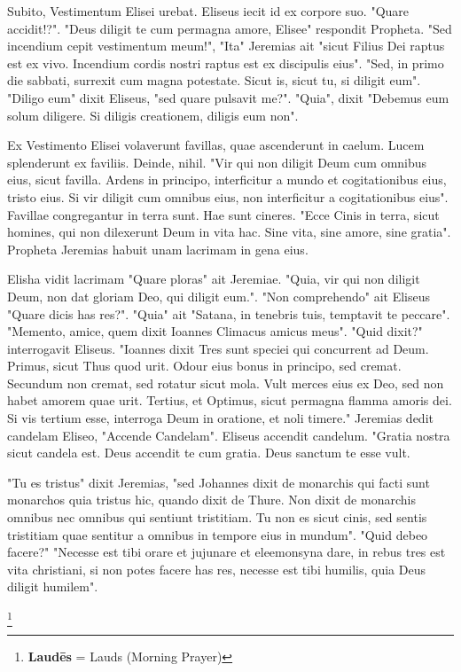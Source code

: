 Subito, Vestimentum Elisei urebat. Eliseus iecit id ex corpore suo. "Quare accidit!?". "Deus diligit te cum permagna amore, Elisee" respondit Propheta. "Sed incendium cepit vestimentum meum!", "Ita" Jeremias ait "sicut Filius Dei raptus est ex vivo. Incendium cordis nostri raptus est ex discipulis eius". "Sed, in primo die sabbati, surrexit cum magna potestate. Sicut is, sicut tu, si diligit eum". "Diligo eum" dixit Eliseus, "sed quare pulsavit me?". "Quia", dixit "Debemus eum solum diligere. Si diligis creationem, diligis eum non". \par 
Ex Vestimento Elisei volaverunt favillas, quae ascenderunt in caelum. Lucem splenderunt ex faviliis. Deinde, nihil. "Vir qui non diligit Deum cum omnibus eius, sicut favilla. Ardens in principo, interficitur a mundo et cogitationibus eius, tristo eius. Si vir diligit cum omnibus eius, non interficitur a cogitationibus eius". Favillae congregantur in terra sunt. Hae sunt cineres. "Ecce Cinis in terra, sicut homines, qui non dilexerunt Deum in vita hac. Sine vita, sine amore, sine gratia". Propheta Jeremias habuit unam lacrimam in gena eius. \par 
Elisha vidit lacrimam "Quare ploras" ait Jeremiae. "Quia, vir qui non diligit Deum, non dat gloriam Deo, qui diligit eum.". "Non comprehendo" ait Eliseus "Quare dicis has res?". "Quia" ait "Satana, in tenebris tuis, temptavit te peccare". "Memento, amice, quem dixit Ioannes Climacus amicus meus". "Quid dixit?" interrogavit Eliseus. "Ioannes dixit \: Tres sunt speciei qui concurrent ad Deum. Primus, sicut Thus quod urit. Odour eius bonus in principo, sed cremat. Secundum non cremat, sed rotatur sicut mola. Vult merces eius ex Deo, sed non habet amorem quae urit. Tertius, et Optimus, sicut permagna flamma amoris dei. Si vis tertium esse, interroga Deum in oratione, et noli timere." Jeremias dedit candelam Eliseo, "Accende Candelam". Eliseus accendit candelum. "Gratia nostra sicut candela est. Deus accendit te cum gratia. Deus sanctum te esse vult. 


"Tu es tristus" dixit Jeremias, "sed Johannes dixit de monarchis qui facti sunt monarchos quia tristus hic, quando dixit de Thure. Non dixit de monarchis omnibus nec omnibus qui sentiunt tristitiam. Tu non es sicut cinis, sed sentis tristitiam quae sentitur a omnibus in tempore eius in mundum". "Quid debeo facere?" "Necesse est tibi orare et jujunare et eleemonsyna dare, in rebus tres est vita christiani, si non potes facere has res, necesse est tibi humilis, quia Deus diligit humilem".

\footnote{\textbf{Laudēs} = Lauds (Morning Prayer)}

